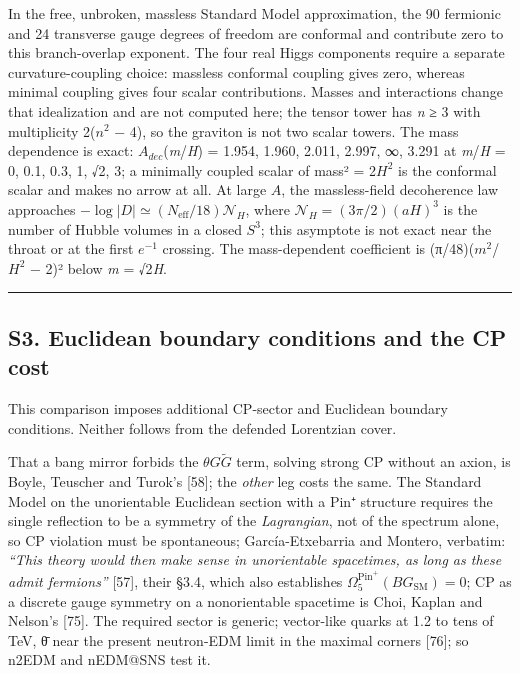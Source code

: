 \documentclass[
]{article}
\begin{document}
In the free, unbroken, massless Standard Model approximation, the 90
fermionic and 24 transverse gauge degrees of freedom are conformal and
contribute zero to this branch-overlap exponent. The four real Higgs
components require a separate curvature-coupling choice: massless
conformal coupling gives zero, whereas minimal coupling gives four
scalar contributions. Masses and interactions change that idealization
and are not computed here; the tensor tower has \emph{n} ≥ 3 with
multiplicity 2(\(n^2\) − 4), so the graviton is not two scalar towers.
The mass dependence is exact: \(A_{dec}\)(\emph{m}/\emph{H}) = 1.954,
1.960, 2.011, 2.997, ∞, 3.291 at \emph{m}/\emph{H} = 0, 0.1, 0.3, 1, √2,
3; a minimally coupled scalar of mass² = 2\(H^2\) is the conformal
scalar and makes no arrow at all. At large \(A\), the massless-field
decoherence law approaches
\(-\log|D|\simeq (N_{\mathrm{eff}}/18)\mathcal N_H\), where
\(\mathcal N_H=(3\pi/2)(aH)^3\) is the number of Hubble volumes in a
closed \(S^3\); this asymptote is not exact near the throat or at the
first \(e^{-1}\) crossing. The mass-dependent coefficient is
(π/48)(\(m^2\)/\(H^2\) − 2)² below \emph{m} = √2\emph{H}.

\begin{center}\rule{0.5\linewidth}{0.5pt}\end{center}

\subsection{S3. Euclidean boundary conditions and the CP
cost}\label{s3.-euclidean-boundary-conditions-and-the-cp-cost}

This comparison imposes additional CP-sector and Euclidean boundary
conditions. Neither follows from the defended Lorentzian cover.

That a bang mirror forbids the \(\theta G\widetilde G\) term, solving
strong CP without an axion, is Boyle, Teuscher and Turok's {[}58{]}; the
\emph{other} leg costs the same. The Standard Model on the unorientable
Euclidean section with a Pin⁺ structure requires the single reflection
to be a symmetry of the \emph{Lagrangian}, not of the spectrum alone, so
CP violation must be spontaneous; García-Etxebarria and Montero,
verbatim: \emph{``This theory would then make sense in unorientable
spacetimes, as long as these admit fermions''} {[}57{]}, their §3.4,
which also establishes
\(\Omega_5^{\mathrm{Pin}^+}(BG_{\mathrm{SM}})=0\); CP as a discrete
gauge symmetry on a nonorientable spacetime is Choi, Kaplan and Nelson's
{[}75{]}. The required sector is generic; vector-like quarks at 1.2 to
tens of TeV, θ̄ near the present neutron-EDM limit in the maximal corners
{[}76{]}; so n2EDM and nEDM@SNS test it.
\end{document}
